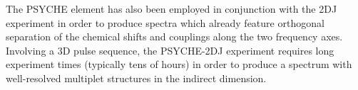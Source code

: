 The \ac{PSYCHE} element has also been employed in conjunction with the \ac{2DJ}
experiment in order to produce spectra which already feature orthogonal
separation of the chemical shifts and couplings along the two frequency
axes\cite{Foroozandeh2015,Kiraly2017}. Involving a \ac{3D} pulse sequence, the
\ac{PSYCHE}-\ac{2DJ} experiment requires long experiment times (typically tens
of hours) in order to produce a spectrum with well-resolved multiplet
structures in the indirect dimension.
